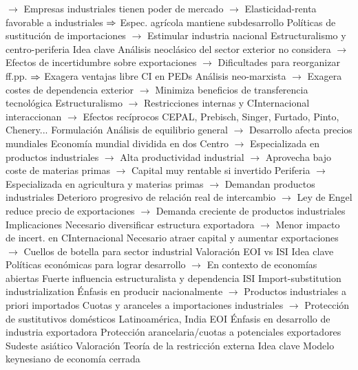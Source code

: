 \documentclass{nuevotema}
\begin{document}
\begin{esquemal}
				\4[] $\to$ Empresas industriales tienen poder de mercado
				\4[] $\to$ Elasticidad-renta favorable a industriales
				\4[] $\Rightarrow$ Espec. agrícola mantiene subdesarrollo
				\4[] Políticas de sustitución de importaciones
				\4[] $\to$ Estimular industria nacional
			\3 Estructuralismo y centro-periferia
				\4 Idea clave
				\4[] Análisis neoclásico del sector exterior no considera
				\4[] $\to$ Efectos de incertidumbre sobre exportaciones
				\4[] $\to$ Dificultades para reorganizar ff.pp.
				\4[] $\Rightarrow$ Exagera ventajas libre CI en PEDs
				\4[] Análisis neo-marxista
				\4[] $\to$ Exagera costes de dependencia exterior
				\4[] $\to$ Minimiza beneficios de transferencia tecnológica
				\4[] Estructuralismo
				\4[] $\to$ Restricciones internas y CInternacional interaccionan
				\4[] $\to$ Efectos recíprocos
				\4[] CEPAL, Prebisch, Singer, Furtado, Pinto, Chenery...
				\4 Formulación
				\4[] Análisis de equilibrio general
				\4[] $\to$ Desarrollo afecta precios mundiales
				\4[] Economía mundial dividida en dos
				\4[] Centro
				\4[] $\to$ Especializada en productos industriales
				\4[] $\to$ Alta productividad industrial
				\4[] $\to$ Aprovecha bajo coste de materias primas
				\4[] $\to$ Capital muy rentable si invertido
				\4[] Periferia
				\4[] $\to$ Especializada en agricultura y materias primas
				\4[] $\to$ Demandan productos industriales
				\4[] Deterioro progresivo de relación real de intercambio
				\4[] $\to$ Ley de Engel reduce precio de exportaciones
				\4[] $\to$ Demanda creciente de productos industriales
				\4 Implicaciones
				\4[] Necesario diversificar estructura exportadora
				\4[] $\to$ Menor impacto de incert. en CInternacional
				\4[] Necesario atraer capital y aumentar exportaciones
				\4[] $\to$ Cuellos de botella para sector industrial
				\4 Valoración
			\3 EOI vs ISI
				\4 Idea clave
				\4[] Políticas económicas para lograr desarrollo
				\4[] $\to$ En contexto de economías abiertas
				\4[] Fuerte influencia estructuralista y dependencia
				\4 ISI
				\4[] Import-substitution industrialization
				\4[] Énfasis en producir nacionalmente
				\4[] $\to$ Productos industriales a priori importados
				\4[] Cuotas y aranceles a importaciones industriales
				\4[] $\to$ Protección de sustitutivos domésticos
				\4[] Latinoamérica, India
				\4 EOI
				\4[] Énfasis en desarrollo de industria exportadora
				\4[] Protección arancelaria/cuotas a potenciales exportadores
				\4[] Sudeste asiático
				\4 Valoración
			\3 Teoría de la restricción externa
				\4 Idea clave
				\4[] Modelo keynesiano de economía cerrada

\end{esquemal}
\end{document}
